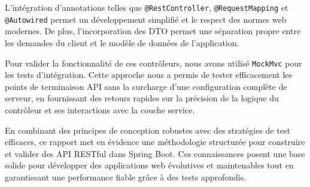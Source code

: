 \documentclass[a4paper,12pt]{article}
\begin{document}
L'intégration d'annotations telles que \texttt{@RestController}, \texttt{@RequestMapping} et \texttt{@Autowired} permet un développement simplifié et le respect des normes web modernes. De plus, l'incorporation des DTO permet une séparation propre entre les demandes du client et le modèle de données de l'application.

Pour valider la fonctionnalité de ces contrôleurs, nous avons utilisé \texttt{MockMvc} pour les tests d'intégration. Cette approche nous a permis de tester efficacement les points de terminaison API sans la surcharge d'une configuration complète de serveur, en fournissant des retours rapides sur la précision de la logique du contrôleur et ses interactions avec la couche service.

En combinant des principes de conception robustes avec des stratégies de test efficaces, ce rapport met en évidence une méthodologie structurée pour construire et valider des API RESTful dans Spring Boot. Ces connaissances posent une base solide pour développer des applications web évolutives et maintenables tout en garantissant une performance fiable grâce à des tests approfondis.
\end{document}
